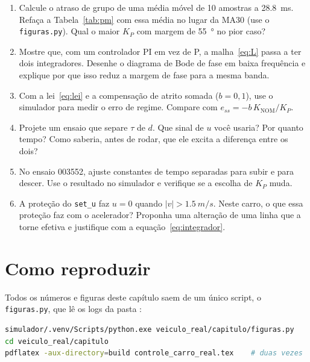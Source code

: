 \documentclass[11pt,a4paper,oneside,openany]{book}
\newcommand{\code}[1]{\texttt{#1}}
\newcommand{\Knom}{K_{\text{NOM}}}
\begin{document}
\begin{enumerate}
  \item Calcule o atraso de grupo de uma média móvel de 10 amostras a \SI{28,8}{ms}. Refaça
    a Tabela~\ref{tab:pm} com essa média no lugar da MA30 (use o \code{figuras.py}). Qual
    o maior $K_P$ com margem de \SI{55}{\degree} no pior caso?
  \item Mostre que, com um controlador PI em vez de P, a malha~\eqref{eq:L} passa a ter dois
    integradores. Desenhe o diagrama de Bode de fase em baixa frequência e explique por que
    isso reduz a margem de fase para a mesma banda.
  \item Com a lei~\eqref{eq:lei} e a compensação de atrito somada ($b = 0{,}1$), use o
    simulador para medir o erro de regime. Compare com $e_{ss} = -b\,\Knom/K_P$.
  \item Projete um ensaio que separe $\tau$ de $d$. Que sinal de $u$ você usaria? Por quanto
    tempo? Como saberia, antes de rodar, que ele excita a diferença entre os dois?
  \item No ensaio 003552, ajuste constantes de tempo separadas para subir e para descer.
    Use o resultado no simulador e verifique se a escolha de $K_P$ muda.
  \item A proteção do \code{set\_u} faz $u = 0$ quando $|v| > \SI{1,5}{m/s}$. Neste carro,
    o que essa proteção faz com o acelerador? Proponha uma alteração de uma linha que a
    torne efetiva e justifique com a equação~\eqref{eq:integrador}.
\end{enumerate}

\section*{Como reproduzir}

Todos os números e figuras deste capítulo saem de um único script, o
\code{figuras.py}, que lê os logs da pasta
:
\begin{lstlisting}[language=bash]
simulador/.venv/Scripts/python.exe veiculo_real/capitulo/figuras.py
cd veiculo_real/capitulo
pdflatex -aux-directory=build controle_carro_real.tex    # duas vezes
\end{lstlisting}
\end{document}
